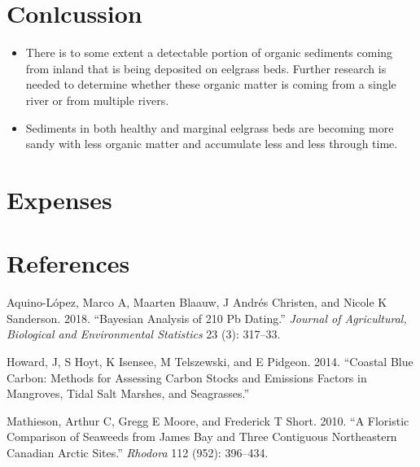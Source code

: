 \documentclass[
  12pt,
]{article}
\newlength{\cslhangindent}
\newlength{\cslentryspacingunit} %
\newenvironment{CSLReferences}[2] %
 {%
  \setlength{\parindent}{0pt}
  \ifodd #1
  \let\oldpar\par
  \def\par{\hangindent=\cslhangindent\oldpar}
  \fi
  \setlength{\parskip}{#2\cslentryspacingunit}
 }%
 {}
\begin{document}
\hypertarget{conlcussion}{%
\section{Conlcussion}\label{conlcussion}}

\begin{itemize}
\item
  There is to some extent a detectable portion of organic sediments
  coming from inland that is being deposited on eelgrass beds. Further
  research is needed to determine whether these organic matter is coming
  from a single river or from multiple rivers.
\item
  Sediments in both healthy and marginal eelgrass beds are becoming more
  sandy with less organic matter and accumulate less and less through
  time.
\end{itemize}

\newpage

\hypertarget{expenses}{%
\section{Expenses}\label{expenses}}

\newpage

\hypertarget{references}{%
\section*{References}\label{references}}

\hypertarget{refs}{}
\begin{CSLReferences}{1}{0}
\leavevmode{}%
Aquino-López, Marco A, Maarten Blaauw, J Andrés Christen, and Nicole K
Sanderson. 2018. {``Bayesian Analysis of 210 Pb Dating.''} \emph{Journal
of Agricultural, Biological and Environmental Statistics} 23 (3):
317--33.

\leavevmode{}%
Howard, J, S Hoyt, K Isensee, M Telszewski, and E Pidgeon. 2014.
{``Coastal Blue Carbon: Methods for Assessing Carbon Stocks and
Emissions Factors in Mangroves, Tidal Salt Marshes, and Seagrasses.''}

\leavevmode{}%
Mathieson, Arthur C, Gregg E Moore, and Frederick T Short. 2010. {``A
Floristic Comparison of Seaweeds from James Bay and Three Contiguous
Northeastern Canadian Arctic Sites.''} \emph{Rhodora} 112 (952):
396--434.

\end{CSLReferences}
\end{document}
